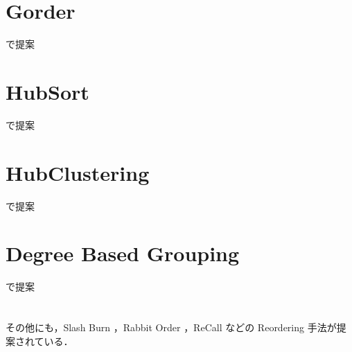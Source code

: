 \section{Gorder}
\cite{wei2016speedup}で提案
\section{HubSort}
\cite{zhang2017making}で提案
\section{HubClustering}
\cite{balaji2018graph}で提案
\section{Degree Based Grouping}
\cite{faldu2019closer}で提案

\section*{}
その他にも，Slash Burn \cite{kang2011beyond}，Rabbit Order \cite{arai2016rabbit}，ReCall \cite{lakhotia2017recall}などの Reordering 手法が提案されている．